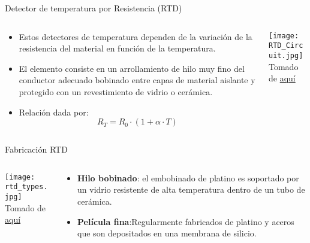 \documentclass[aspectratio=169]{beamer}
\begin{document}
\begin{frame}{Detector de temperatura por Resistencia (RTD)}
    \begin{columns}[c, onlytextwidth]
        \begin{column}{0.55\textwidth}
            \begin{itemize}
                \item Estos detectores de temperatura dependen de la variación de la resistencia del material en función de la temperatura.  
                \item El elemento consiste en un arrollamiento de hilo muy fino del conductor adecuado bobinado entre capas de material aislante y protegido con un revestimiento de vidrio o cerámica. 
                \item Relación dada por: 
                \begin{equation*}
                    R_T=R_0\cdot (1+\alpha \cdot T)
                \end{equation*}
            \end{itemize}
        \end{column}
        \begin{column}{0.45\textwidth}
            \texttt{[image: RTD\_Circuit.jpg]}
            \\ \tiny{Tomado de \href{https://www.azom.com/article.aspx?ArticleID=5573}{aquí}}
        \end{column}
    \end{columns}
\end{frame}
\begin{frame}{Fabricación RTD}
    \begin{columns}[c, onlytextwidth]
        \begin{column}{0.45\textwidth}
        \texttt{[image: rtd\_types.jpg]}
            \\ \tiny{Tomado de \href{https://www.designworldonline.com/designing-with-rtd-temperature-sensors/}{aquí}}
            
        \end{column}
        \begin{column}{0.55\textwidth}
            \begin{itemize}
                \item \textbf{Hilo bobinado}: el embobinado de platino es soportado por un vidrio resistente de alta temperatura dentro de un tubo de cerámica.     
                \item \textbf{Película fina}:Regularmente fabricados de platino y aceros que son depositados en una membrana de silicio.
            \end{itemize}
        \end{column}
    \end{columns}
\end{frame}
\end{document}
